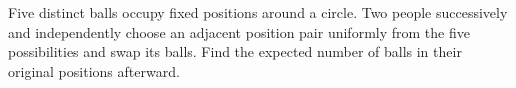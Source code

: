 Five distinct balls occupy fixed positions around a circle. Two people successively and independently choose an adjacent position pair uniformly from the five possibilities and swap its balls. Find the expected number of balls in their original positions afterward.

